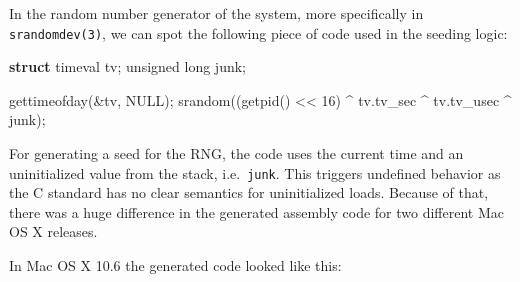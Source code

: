 \documentclass[
  a4paper,
]{report}
\newenvironment{Shaded}{}{}
\newcommand{\BaseNTok}[1]{\textcolor[rgb]{0.25,0.63,0.44}{#1}}
\newcommand{\BuiltInTok}[1]{\textcolor[rgb]{0.00,0.50,0.00}{#1}}
\newcommand{\CommentTok}[1]{\textcolor[rgb]{0.38,0.63,0.69}{\textit{#1}}}
\newcommand{\DataTypeTok}[1]{\textcolor[rgb]{0.56,0.13,0.00}{#1}}
\newcommand{\DecValTok}[1]{\textcolor[rgb]{0.25,0.63,0.44}{#1}}
\newcommand{\KeywordTok}[1]{\textcolor[rgb]{0.00,0.44,0.13}{\textbf{#1}}}
\newcommand{\NormalTok}[1]{#1}
\newcommand{\OperatorTok}[1]{\textcolor[rgb]{0.40,0.40,0.40}{#1}}
\begin{document}
In the random number generator of the system, more specifically in
\texttt{srandomdev(3)}, we can spot the following piece of code used in
the seeding logic:

\begin{Shaded}
\begin{Highlighting}[]
\KeywordTok{struct}\NormalTok{ timeval tv}\OperatorTok{;}
\DataTypeTok{unsigned} \DataTypeTok{long}\NormalTok{ junk}\OperatorTok{;}

\NormalTok{gettimeofday}\OperatorTok{(\&}\NormalTok{tv}\OperatorTok{,}\NormalTok{ NULL}\OperatorTok{);}
\NormalTok{srandom}\OperatorTok{((}\NormalTok{getpid}\OperatorTok{()} \OperatorTok{\textless{}\textless{}} \DecValTok{16}\OperatorTok{)} \OperatorTok{\^{}}\NormalTok{ tv}\OperatorTok{.}\NormalTok{tv\_sec }\OperatorTok{\^{}}\NormalTok{ tv}\OperatorTok{.}\NormalTok{tv\_usec }\OperatorTok{\^{}}\NormalTok{ junk}\OperatorTok{);}
\end{Highlighting}
\end{Shaded}

For generating a seed for the RNG, the code uses the current time and an
uninitialized value from the stack, i.e.~\texttt{junk}. This triggers
undefined behavior as the C standard has no clear semantics for
uninitialized loads. Because of that, there was a huge difference in the
generated assembly code for two different Mac OS X releases.

In Mac OS X 10.6 the generated code looked like this:

\begin{Shaded}
\end{Shaded}
\end{document}
